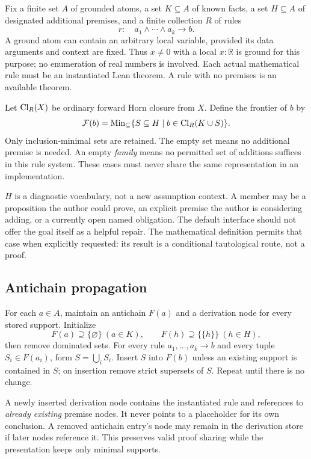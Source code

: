 \documentclass[11pt,a4paper]{article}
\newcommand{\R}{\mathbb R}\newcommand{\Q}{\mathbb Q}\newcommand{\Z}{\mathbb Z}\newcommand{\N}{\mathbb N}
\theoremstyle{definition}\newtheorem{definition}[theorem]{Definition}
\theoremstyle{remark}\newtheorem{remark}[theorem]{Remark}
\begin{document}
Fix a finite set $A$ of grounded atoms, a set $K\subseteq A$ of known facts, a set $H\subseteq A$ of designated additional premises, and a finite collection $R$ of rules
\[
 r:\quad a_1\land\cdots\land a_k\longrightarrow b.
\]
A ground atom can contain an arbitrary local variable, provided its data arguments and context are fixed. Thus $x\ne0$ with a local $x:\R$ is ground for this purpose; no enumeration of real numbers is involved. Each actual mathematical rule must be an instantiated Lean theorem. A rule with no premises is an available theorem.

Let $\operatorname{Cl}_R(X)$ be ordinary forward Horn closure from $X$. Define the frontier of $b$ by
\begin{equation}\label{eq:frontier}
 \mathcal F(b)=\operatorname{Min}_{\subseteq}\{S\subseteq H\mid b\in\operatorname{Cl}_R(K\cup S)\}.
\end{equation}
Only inclusion-minimal sets are retained. The empty set means no additional premise is needed. An empty \emph{family} means no permitted set of additions suffices in this rule system. These cases must never share the same representation in an implementation.

$H$ is a diagnostic vocabulary, not a new assumption context. A member may be a proposition the author could prove, an explicit premise the author is considering adding, or a currently open named obligation. The default interface should not offer the goal itself as a helpful repair. The mathematical definition permits that case when explicitly requested: its result is a conditional tautological route, not a proof.

\subsection{Antichain propagation}
For each $a\in A$, maintain an antichain $F(a)$ and a derivation node for every stored support. Initialize
\[
 F(a)\supseteq\{\varnothing\}\ (a\in K),\qquad
 F(h)\supseteq\{\{h\}\}\ (h\in H),
\]
then remove dominated sets. For every rule $a_1,\ldots,a_k\to b$ and every tuple $S_i\in F(a_i)$, form $S=\bigcup_i S_i$. Insert $S$ into $F(b)$ unless an existing support is contained in $S$; on insertion remove strict supersets of $S$. Repeat until there is no change.

A newly inserted derivation node contains the instantiated rule and references to \emph{already existing} premise nodes. It never points to a placeholder for its own conclusion. A removed antichain entry's node may remain in the derivation store if later nodes reference it. This preserves valid proof sharing while the presentation keeps only minimal supports.
\end{document}
